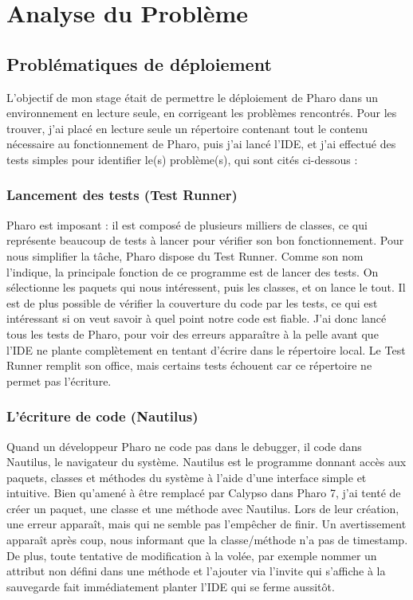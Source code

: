 \section{Analyse du Problème}

\subsection{Problématiques de déploiement}
L'objectif de mon stage était de permettre le déploiement de Pharo dans un environnement en lecture seule, en corrigeant les problèmes rencontrés. Pour les trouver, j'ai placé en lecture seule un répertoire contenant tout le contenu nécessaire au fonctionnement de Pharo, puis j'ai lancé l'IDE, et j'ai effectué des tests simples pour identifier le(s) problème(s), qui sont cités ci-dessous :

\subsubsection{Lancement des tests (Test Runner)}
Pharo est imposant : il est composé de plusieurs milliers de classes, ce qui représente beaucoup de tests à lancer pour vérifier son bon fonctionnement. Pour nous simplifier la tâche, Pharo dispose du Test Runner. Comme son nom l'indique, la principale fonction de ce programme est de lancer des tests. On sélectionne les paquets qui nous intéressent, puis les classes, et on lance le tout. Il est de plus possible de vérifier la couverture du code par les tests, ce qui est intéressant si on veut savoir à quel point notre code est fiable. J'ai donc lancé tous les tests de Pharo, pour voir des erreurs apparaître à la pelle avant que l'IDE ne plante complètement en tentant d'écrire dans le répertoire local. Le Test Runner remplit son office, mais certains tests échouent car ce répertoire ne permet pas l'écriture.

\subsubsection{L'écriture de code (Nautilus)}
Quand un développeur Pharo ne code pas dans le debugger, il code dans Nautilus, le navigateur du système. Nautilus est le programme donnant accès aux paquets, classes et méthodes du système à l'aide d'une interface simple et intuitive. Bien qu'amené à être remplacé par Calypso dans Pharo 7, j'ai tenté de créer un paquet, une classe et une méthode avec Nautilus. Lors de leur création, une erreur apparaît, mais qui ne semble pas l'empêcher de finir. Un avertissement apparaît après coup, nous informant que la classe/méthode n'a pas de timestamp. De plus, toute tentative de modification à la volée, par exemple nommer un attribut non défini dans une méthode et l'ajouter via l'invite qui s'affiche à la sauvegarde fait immédiatement planter l'IDE qui se ferme aussitôt.

